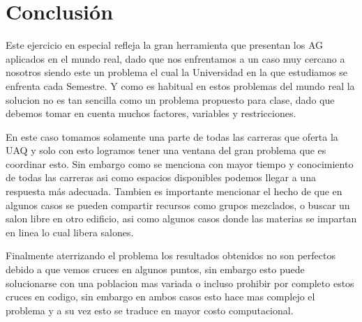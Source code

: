 \section{Conclusión}
Este ejercicio en especial refleja la gran herramienta que presentan los AG aplicados en el mundo real, dado que nos enfrentamos a un caso
muy cercano a nosotros siendo este un problema el cual la Universidad en la que estudiamos se enfrenta cada Semestre. Y como es habitual
en estos problemas del mundo real la solucion no es tan sencilla como un problema propuesto para clase, dado que debemos tomar en cuenta muchos
factores, variables y restricciones.

En este caso tomamos solamente una parte de todas las carreras que oferta la UAQ y solo con esto logramos tener una ventana del gran problema que es 
coordinar esto. Sin embargo como se menciona con mayor tiempo y conocimiento de todas las carreras asi como espacios disponibles podemos llegar a una 
respuesta más adecuada. Tambien es importante mencionar el hecho de que en algunos casos se pueden compartir recursos como grupos mezclados, o buscar
un salon libre en otro edificio, asi como algunos casos donde las materias se impartan en linea lo cual libera salones.

Finalmente aterrizando el problema los resultados obtenidos no son perfectos debido a que vemos cruces en algunos puntos, sin embargo esto puede
solucionarse con una poblacion mas variada o incluso prohibir por completo estos cruces en codigo, sin embargo en ambos casos esto hace mas complejo
el problema y a su vez esto se traduce en mayor costo computacional.